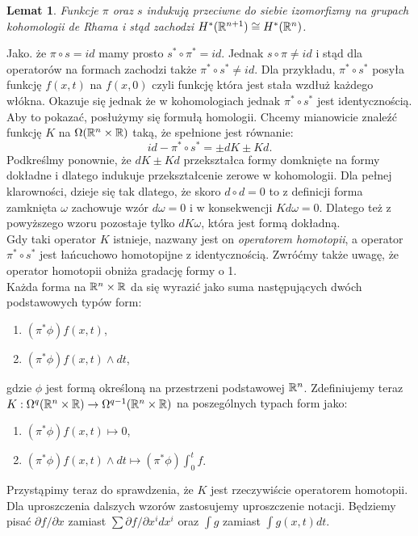 \documentclass[licencjacka]{pracamgr}
\theoremstyle{definition}
\theoremstyle{definition}
\theoremstyle{plain}
\newtheorem{lemma}{Lemat}[section]
\theoremstyle{plain}
\theoremstyle{plain}
\theoremstyle{plain}
\def\R{\ensuremath\mathbb{R}}
\begin{document}
\begin{lemma}
Funkcje $\pi$ oraz $s$ indukują przeciwne do siebie izomorfizmy na grupach
kohomologii de Rhama i stąd zachodzi $H^\ast(\R^{n+1}) \cong H^\ast(\R^{n})$.
\end{lemma}


Jako. że $\pi \circ s = id$  mamy prosto $s^\ast \circ \pi^\ast = id$. Jednak
$s \circ \pi \neq id$ i stąd dla operatorów
na formach zachodzi także $\pi^\ast \circ s^\ast \neq id$. Dla przykładu,
$\pi^\ast \circ s^\ast$ posyła funkcję $f(x, t)$ na $f(x, 0)$ czyli 
funkcję która jest stała wzdłuż każdego włókna. Okazuje się jednak
że w kohomologiach jednak $\pi^\ast \circ s^\ast$ jest identycznością.
Aby to pokazać, posłużymy się formułą homologii. Chcemy mianowicie
znaleźć funkcję $K$ na $\Omega(\R^n \times \R)$ taką, że spełnione jest
równanie:
\[
    id- \pi^\ast \circ s^\ast = \pm dK \pm Kd.
\]
Podkreślmy ponownie, że $dK \pm Kd$ przekształca formy domknięte
na formy dokładne i dlatego indukuje przekształcenie zerowe w kohomologii. 
Dla pełnej klarowności, dzieje się tak dlatego, że skoro $d \circ d = 0$
to z definicji forma zamknięta $\omega$ zachowuje wzór $d \omega = 0$ i
w konsekwencji $K d \omega = 0$. Dlatego też z powyższego wzoru pozostaje
tylko $d K \omega$, która jest formą dokładną. \\

Gdy taki operator $K$ istnieje, nazwany jest on \emph{operatorem homotopii},
a operator $\pi^\ast \circ s^\ast$ jest łańcuchowo homotopijne z identycznością.
Zwróćmy także uwagę, że operator homotopii obniża gradację formy o 1. \\

Każda forma na $\R^n \times \R$ da się wyrazić jako suma następujących
dwóch podstawowych typów form:

\begin{enumerate}
    \item $(\pi^\ast \phi)f(x,t)$, 
    \item $(\pi^\ast \phi)f(x,t) \wedge dt$,
\end{enumerate}

gdzie $\phi$ jest formą określoną na przestrzeni podstawowej $\R^n$.
Zdefiniujemy teraz
$K: \Omega^{q} (\R^n \times \R) \rightarrow \Omega^{q-1} (\R^n \times \R)$ 
na poszególnych typach form jako:
\begin{enumerate}
    \item $(\pi^\ast \phi)f(x,t) \mapsto 0$,
    \item $(\pi^\ast \phi)f(x,t) \wedge dt \mapsto (\pi^\ast \phi) \int_0^t f$.
\end{enumerate}
Przystąpimy teraz do sprawdzenia, że $K$ jest rzeczywiście operatorem homotopii.
Dla uproszczenia dalszych wzorów zastosujemy uproszczenie notacji. Będziemy
pisać $\partial f / \partial x$ zamiast $\sum \partial f / \partial x^i dx^i$
oraz $\int g$ zamiast $\int g(x, t) dt$. \\
\end{document}
